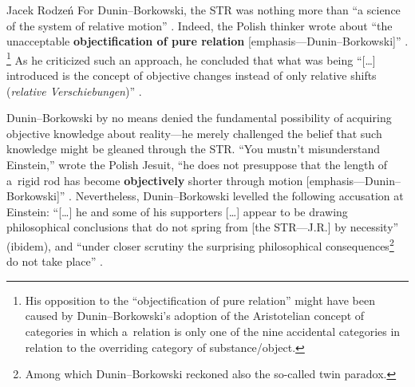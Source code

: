 \begin{artengenv}{Jacek Rodzeń}
For Dunin–Borkowski, the STR was nothing more than ``a science of the system of relative motion''
\parencite*[][p.213]{dunin-borkowski_neue_1921}. %
 Indeed, the Polish thinker wrote about ``the unacceptable \textbf{objectification of pure relation} [emphasis---Dunin–Borkowski]'' 
\parencite*[][pp.214–215]{dunin-borkowski_neue_1921}.%
\footnote{His opposition to the ``objectification of pure relation'' might have been caused by Dunin--Borkowski's adoption of the Aristotelian concept of categories in which a~relation is only one of the nine accidental categories in relation to the overriding category of substance/object.} As he criticized such an approach, he concluded that what was being ``[…] introduced is the concept of objective changes instead of only relative shifts (\textit{relative Verschiebungen})'' 
\parencite*[][p.214]{dunin-borkowski_neue_1921}.%


Dunin–Borkowski by no means denied the fundamental possibility of acquiring objective knowledge about reality---he merely challenged the belief that such knowledge might be gleaned through the STR. ``You mustn't misunderstand Einstein,'' wrote the Polish Jesuit, ``he does not presuppose that the length of a~rigid rod has become \textbf{objectively} shorter through motion [emphasis---Dunin–Borkowski]''
\parencite*[][p.212]{dunin-borkowski_neue_1921}. %
 Nevertheless, Dunin–Borkowski levelled the following accusation at Einstein: ``[\ldots] he and some of his supporters […] appear to be drawing philosophical conclusions that do not spring from [the STR---J.R.] by necessity'' (ibidem), and ``under closer scrutiny the surprising philosophical consequences\footnote{Among which Dunin--Borkowski reckoned also the so-called twin paradox.} do not take place'' 
\parencite*[][p.215]{dunin-borkowski_neue_1921}.%



\end{artengenv}
